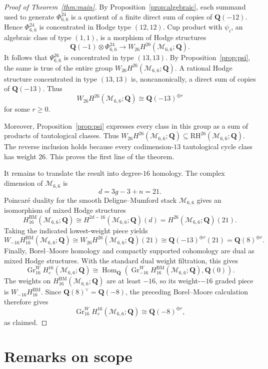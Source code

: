 \documentclass[11pt,reqno]{amsart}
\newcommand{\Q}{\mathbf{Q}}
\newcommand{\M}{\mathcal{M}}
\newcommand{\BM}{\mathrm{BM}}
\newcommand{\RH}{\mathrm{RH}}
\newcommand{\Gr}{\operatorname{Gr}}
\theoremstyle{definition}
\theoremstyle{remark}
\begin{document}
\begin{proof}[Proof of Theorem~\ref{thm:main}]
By Proposition~\ref{prop:algebraic}, each summand used to generate
$\Phi^{24}_{6,6}$ is a quotient of a finite direct sum of copies of
$\Q(-12)$.  Hence $\Phi^{24}_{6,6}$ is concentrated in Hodge type $(12,12)$.
Cup product with $\psi_i$, an algebraic class of type $(1,1)$, is a morphism
of Hodge structures
\[
  \Q(-1)\otimes\Phi^{24}_{6,6}
  \longrightarrow W_{26}H^{26}(\M_{6,6};\Q).
\]
It follows that $\Psi^{26}_{6,6}$ is concentrated in type $(13,13)$.  By
Proposition~\ref{prop:psi}, the same is true of the entire group
$W_{26}H^{26}(\M_{6,6};\Q)$.  A rational Hodge structure concentrated in
type $(13,13)$ is, noncanonically, a direct sum of copies of $\Q(-13)$.
Thus
\[
  W_{26}H^{26}(\M_{6,6};\Q)\cong\Q(-13)^{\oplus r}
\]
for some $r\geq0$.

Moreover, Proposition~\ref{prop:psi} expresses every class in this group as
a sum of products of tautological classes.  Thus
$W_{26}H^{26}(\M_{6,6};\Q)\subseteq\RH^{26}(\M_{6,6};\Q)$.  The reverse
inclusion holds because every codimension-$13$ tautological cycle class has
weight $26$.  This proves the first line of the theorem.

It remains to translate the result into degree-$16$ homology.  The complex
dimension of $\M_{6,6}$ is
\[
  d=3g-3+n=21.
\]
Poincar\'e duality for the smooth Deligne--Mumford stack $\M_{6,6}$ gives an
isomorphism of mixed Hodge structures
\[
  H^{\BM}_{16}(\M_{6,6};\Q)
  \cong H^{2d-16}(\M_{6,6};\Q)(d)
  =H^{26}(\M_{6,6};\Q)(21).
\]
Taking the indicated lowest-weight piece yields
\[
  W_{-16}H^{\BM}_{16}(\M_{6,6};\Q)
  \cong W_{26}H^{26}(\M_{6,6};\Q)(21)
  \cong \Q(-13)^{\oplus r}(21)
  =\Q(8)^{\oplus r}.
\]
Finally, Borel--Moore homology and compactly supported cohomology are dual as
mixed Hodge structures.  With the standard dual weight filtration, this gives
\[
  \Gr^W_{16}H_c^{16}(\M_{6,6};\Q)
  \cong
  \operatorname{Hom}_{\Q}\!\left(
    \Gr^W_{-16}H^{\BM}_{16}(\M_{6,6};\Q),\Q(0)
  \right).
\]
The weights on $H^{\BM}_{16}(\M_{6,6};\Q)$ are at least $-16$, so its
weight-$-16$ graded piece is $W_{-16}H^{\BM}_{16}$.  Since
$\Q(8)^\vee=\Q(-8)$, the preceding Borel--Moore calculation therefore gives
\[
  \Gr^W_{16}H_c^{16}(\M_{6,6};\Q)
  \cong\Q(-8)^{\oplus r},
\]
as claimed.
\end{proof}

\section{Remarks on scope}
\end{document}
